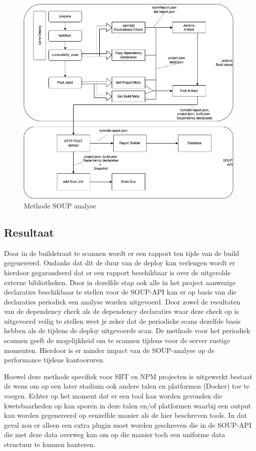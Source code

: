 \begin{figure}
    \centering
    \includegraphics[width=15cm]{gfx/methode_Jenkins}
    \caption{Methode SOUP analyse}
    \label{fig:methodeSOUPanalyse}
\end{figure}

\subsection{Resultaat}\label{subsec:resultaat}
Door in de buildstraat te scannen wordt er een rapport ten tijde van de build gegenereerd. Ondanks dat dit de duur van de deploy kan verlengen wordt er hierdoor gegarandeerd dat er een rapport beschikbaar is over de uitgerolde externe bibliotheken. Door in dezelfde stap ook alle in het project aanwezige declaraties beschikbaar te stellen voor de SOUP-API kan er op basis van die declaraties periodiek een analyse worden uitgevoerd. Door zowel de resultaten van de dependency check als de dependency declaraties waar deze check op is uitgevoerd veilig te stellen weet je zeker dat de periodieke scans dezelfde basis hebben als de tijdens de deploy uitgevoerde scan. De methode voor het periodiek scannen geeft de mogelijkheid om te scannen tijdens voor de server rustige momenten. Hierdoor is er minder impact van de SOUP-analyse op de performance tijdens kantooruren.

Hoewel deze methode specifiek voor SBT en NPM projecten is uitgewerkt bestaat de wens om op een later stadium ook andere talen en platformen (Docker) toe te voegen. Echter op het moment dat er een tool kan worden gevonden die kwetsbaarheden op kan sporen in deze talen en/of platformen waarbij een output kan worden gegenereerd op eenzelfde manier als de hier beschreven tools. In dat geval zou er alleen een extra plugin moet worden geschreven die in de SOUP-API die met deze data overweg kan om op die manier toch een uniforme data structuur te kunnen hanteren.

